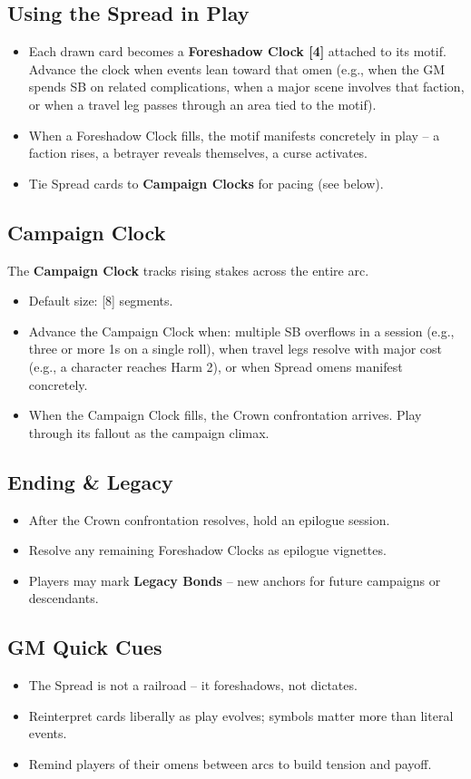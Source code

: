 \subsection{Using the Spread in Play}
\begin{itemize}
  \item Each drawn card becomes a \textbf{Foreshadow Clock [4]} attached to its motif. Advance the clock when events lean toward that omen (e.g., when the GM spends SB on related complications, when a major scene involves that faction, or when a travel leg passes through an area tied to the motif).
  \item When a Foreshadow Clock fills, the motif manifests concretely in play – a faction rises, a betrayer reveals themselves, a curse activates.
  \item Tie Spread cards to \textbf{Campaign Clocks} for pacing (see below).
\end{itemize}

\subsection{Campaign Clock}
The \textbf{Campaign Clock} tracks rising stakes across the entire arc.
\begin{itemize}
  \item Default size: [8] segments.
  \item Advance the Campaign Clock when: multiple SB overflows in a session (e.g., three or more 1s on a single roll), when travel legs resolve with major cost (e.g., a character reaches Harm 2), or when Spread omens manifest concretely.
  \item When the Campaign Clock fills, the Crown confrontation arrives. Play through its fallout as the campaign climax.
\end{itemize}

\subsection{Ending \& Legacy}
\begin{itemize}
  \item After the Crown confrontation resolves, hold an epilogue session.
  \item Resolve any remaining Foreshadow Clocks as epilogue vignettes.
  \item Players may mark \textbf{Legacy Bonds} – new anchors for future campaigns or descendants.
\end{itemize}

\subsection{GM Quick Cues}
\begin{itemize}
  \item The Spread is not a railroad – it foreshadows, not dictates.
  \item Reinterpret cards liberally as play evolves; symbols matter more than literal events.
  \item Remind players of their omens between arcs to build tension and payoff.
\end{itemize}